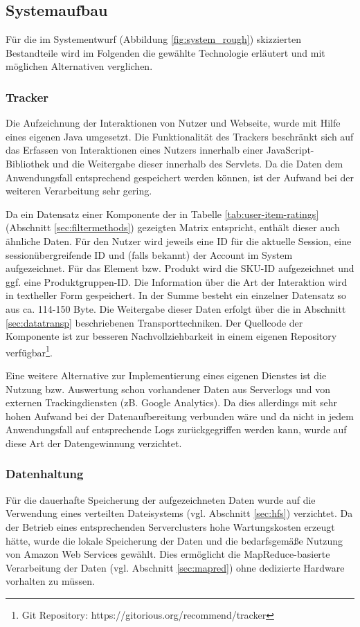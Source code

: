 \subsection{Systemaufbau}

Für die im Systementwurf (Abbildung \ref{fig:system_rough}) skizzierten Bestandteile wird im Folgenden die gewählte Technologie erläutert und mit möglichen Alternativen verglichen.

\subsubsection{Tracker} \label{sec:tracker-impl} Die Aufzeichnung der Interaktionen von Nutzer und Webseite, wurde mit Hilfe eines eigenen Java  umgesetzt. Die Funktionalität des Trackers beschränkt sich auf das Erfassen von Interaktionen eines Nutzers innerhalb einer JavaScript-Bibliothek und die Weitergabe dieser innerhalb des Servlets. Da die Daten dem Anwendungsfall entsprechend gespeichert werden können, ist der Aufwand bei der weiteren Verarbeitung sehr gering.

Da ein Datensatz einer Komponente der in Tabelle \ref{tab:user-item-ratings} (Abschnitt \ref{sec:filtermethods}) gezeigten Matrix entspricht, enthält dieser auch ähnliche Daten. Für den Nutzer wird jeweils eine ID für die aktuelle Session, eine sessionübergreifende ID und (falls bekannt) der Account im System aufgezeichnet. Für das Element bzw. Produkt wird die \gls{SKU-ID} aufgezeichnet und ggf. eine Produktgruppen-\gls{ID}. Die Information über die Art der Interaktion wird in textheller Form gespeichert. In der Summe besteht ein einzelner Datensatz so aus ca. 114-150 Byte. Die Weitergabe dieser Daten erfolgt über die in Abschnitt \ref{sec:datatransp} beschriebenen Transporttechniken. Der Quellcode der Komponente ist zur besseren Nachvollziehbarkeit in einem eigenen \gls{Repository} verfügbar\footnote{Git Repository: https://gitorious.org/recommend/tracker}.

Eine weitere Alternative zur Implementierung eines eigenen Dienstes ist die Nutzung bzw. Auswertung schon vorhandener Daten aus Serverlogs und von externen Trackingdiensten (zB. Google Analytics). Da dies allerdings mit sehr hohen Aufwand bei der Datenaufbereitung verbunden wäre und da nicht in jedem Anwendungsfall auf entsprechende Logs zurückgegriffen werden kann, wurde auf diese Art der Datengewinnung verzichtet.

\subsubsection{Datenhaltung} Für die dauerhafte Speicherung der aufgezeichneten Daten wurde auf die Verwendung eines verteilten Dateisystems (vgl. Abschnitt \ref{sec:hfs}) verzichtet. Da der Betrieb eines entsprechenden Serverclusters hohe Wartungskosten erzeugt hätte, wurde die lokale Speicherung der Daten und die bedarfsgemäße Nutzung von Amazon Web Services gewählt. Dies ermöglicht die MapReduce-basierte Verarbeitung der Daten (vgl. Abschnitt \ref{sec:mapred}) ohne dedizierte Hardware vorhalten zu müssen.

